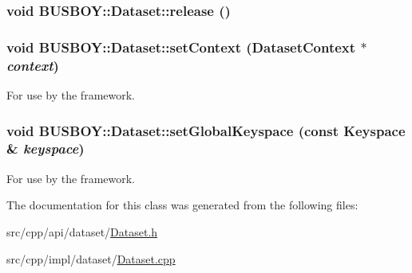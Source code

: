 \label{classBUSBOY_1_1Dataset_a18b50dbc0c385a74b2792573f7285266}
\hypertarget{classBUSBOY_1_1Dataset_a51764b4447cad2364b5ea16415e08b67}{
\subsubsection[{release}]{\setlength{\rightskip}{0pt plus 5cm}void BUSBOY::Dataset::release ()}}
\label{classBUSBOY_1_1Dataset_a51764b4447cad2364b5ea16415e08b67}
\hypertarget{classBUSBOY_1_1Dataset_aa9b353a7b61f332bad63adc36bf5a9cb}{
\subsubsection[{setContext}]{\setlength{\rightskip}{0pt plus 5cm}void BUSBOY::Dataset::setContext ({\bf DatasetContext} $\ast$ {\em context})}}
\label{classBUSBOY_1_1Dataset_aa9b353a7b61f332bad63adc36bf5a9cb}


For use by the framework. \hypertarget{classBUSBOY_1_1Dataset_a48d6e5a8ea34c64459a3165903021497}{
\subsubsection[{setGlobalKeyspace}]{\setlength{\rightskip}{0pt plus 5cm}void BUSBOY::Dataset::setGlobalKeyspace (const {\bf Keyspace} \& {\em keyspace})}}
\label{classBUSBOY_1_1Dataset_a48d6e5a8ea34c64459a3165903021497}


For use by the framework. 

The documentation for this class was generated from the following files:\begin{DoxyCompactItemize}
\item 
src/cpp/api/dataset/\hyperlink{Dataset_8h}{Dataset.h}\item 
src/cpp/impl/dataset/\hyperlink{Dataset_8cpp}{Dataset.cpp}\end{DoxyCompactItemize}
